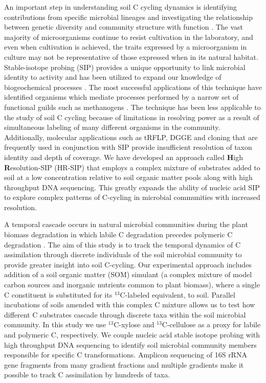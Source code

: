 An important step in understanding soil C cycling dynamics is identifying
contributions from specific microbial lineages and investigating the
relationship between genetic diversity and community structure with function
\citep{O_Donnell_2002}. The vast majority of microorganisms continue to resist
cultivation in the laboratory, and even when cultivation is achieved, the
traits expressed by a microorganism in culture may not be representative of
those expressed when in its natural habitat. Stable-isotope probing (SIP)
provides a unique opportunity to link microbial identity to activity and has
been utilized to expand our knowledge of biogeochemical processes
\citep{Chen_Murrell_2010}. The most successful applications of this technique
have identified organisms which mediate processes performed by a narrow set of
functional guilds such as methanogens \citep{Lu_2005}. The technique has been
less applicable to the study of soil C cycling because of limitations in
resolving power as a result of simultaneous labeling of many different
organisms in the community. Additionally, molecular applications such as tRFLP,
DGGE and cloning that are frequently used in conjunction with SIP provide
insufficient resolution of taxon identity and depth of coverage. We have
developed an approach called \textbf{H}igh \textbf{R}esolution-SIP (HR-SIP)
that employs a complex mixture of substrates added to soil at a low
concentration relative to soil organic matter pools along with high throughput
DNA sequencing. This greatly expands the ability of nucleic acid SIP to explore
complex patterns of C-cycling in microbial communities with increased
resolution.

A temporal cascade occurs in natural microbial communities during the plant
biomass degradation in which labile C degradation precedes polymeric C
degradation \citep{Hu_1997,Rui_2009}.  The aim of this study is to track the
temporal dynamics of C assimilation through discrete individuals of the soil
microbial community to provide greater insight into soil C-cycling.  Our
experimental approach includes addition of a soil organic matter (SOM) simulant
(a complex mixture of model carbon sources and inorganic nutrients common to
plant biomass), where a single C constituent is substituted for its
$^{13}$C-labeled equivalent, to soil.  Parallel incubations of soils amended
with this complex C mixture allows us to test how different C substrates
cascade through discrete taxa within the soil microbial community.  In this
study we use $^{13}$C-xylose and $^{13}$C-cellulose as a proxy for labile and
polymeric C, respectively.  We couple nucleic acid stable isotope probing with
high throughput DNA sequencing to identify soil microbial community members
responsible for specific C transformations.  Amplicon sequencing of 16S rRNA
gene fragments from many gradient fractions and multiple gradients make it
possible to track C assimilation by hundreds of taxa.
